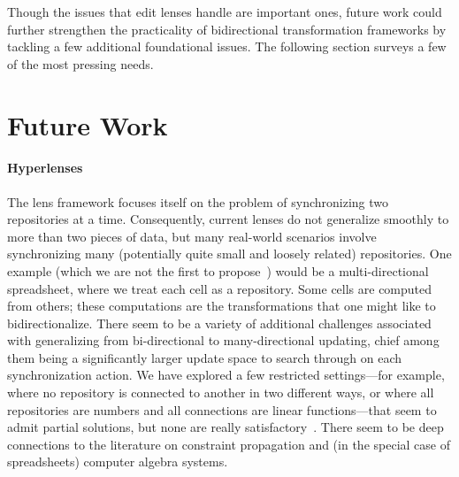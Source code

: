 Though the issues that edit lenses handle are important ones, future work
could further strengthen the practicality of bidirectional transformation
frameworks by tackling a few additional foundational issues. The following
section surveys a few of the most pressing needs.

\section{Future Work}
\label{sec:future}

\paragraph*{Hyperlenses}
The lens framework focuses itself on the problem of synchronizing two
repositories at a time. Consequently, current lenses do not generalize
smoothly to more than two pieces of data, but many real-world scenarios
involve synchronizing many (potentially quite small and loosely related)
repositories. One example (which we are not the first to
propose~\cite{macedotowards}) would be a multi-directional spreadsheet,
where we treat each cell as a repository. Some cells are computed from
others; these computations are the transformations that one might like to
bidirectionalize. There seem to be a variety of additional challenges
associated with generalizing from bi-directional to many-directional
updating, chief among them being a significantly larger update space to
search through on each synchronization action. We have explored a few
restricted settings---for example, where no repository is connected to
another in two different ways, or where all repositories are numbers and all
connections are linear functions---that seem to admit partial solutions, but
none are really satisfactory~\cite{wagner2013generalizing}. There seem to be
deep connections to the literature on constraint propagation and (in the
special case of spreadsheets) computer algebra systems.


